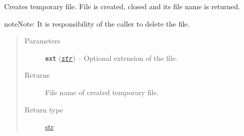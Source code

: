 \documentclass[a4paper,10pt,english]{sphinxmanual}
\begin{document}
\begin{fulllineitems}
\label{aqueduct.utils.helpers:aqueduct.utils.helpers.create_tmpfile}
Creates temporary file. File is created, closed and its file name is returned.

\begin{notice}{note}{Note:}
It is responsibility of the caller to delete the file.
\end{notice}
\begin{quote}\begin{description}
\item[{Parameters}] \leavevmode
\textbf{\texttt{ext}} (\href{https://docs.python.org/2/library/functions.html\#str}{\emph{\texttt{str}}}) -- Optional extension of the file.

\item[{Returns}] \leavevmode
File name of created temporary file.

\item[{Return type}] \leavevmode
\href{https://docs.python.org/2/library/functions.html\#str}{str}

\end{description}\end{quote}

\end{fulllineitems}

\end{document}
